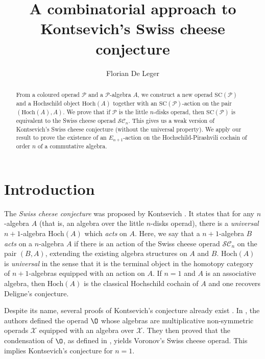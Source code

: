 \documentclass[]{amsart}
\title{A combinatorial approach to Kontsevich's Swiss cheese conjecture}
\author[Florian De Leger]{Florian De Leger}
\theoremstyle{definition}
\begin{document}
	
\begin{abstract}
	From a coloured operad $\mathcal{P}$ and a $\mathcal{P}$-algebra $A$, we construct a new operad $\mathrm{SC}(\mathcal{P})$ and a Hochschild object $\mathrm{Hoch}(A)$ together with an $\mathrm{SC}(\mathcal{P})$-action on the pair $(\mathrm{Hoch}(A),A)$. We prove that if $\mathcal{P}$ is the little $n$-disks operad, then $\mathrm{SC}(\mathcal{P})$ is equivalent to the Swiss cheese operad $\mathcal{SC}_n$.  This gives us a weak version of Kontsevich's Swiss cheese conjecture (without the universal property). We apply our result to prove the existence of an $E_{n+1}$-action on the Hochschild-Pirashvili cochain of order $n$ of a commutative algebra.
\end{abstract}
	
\maketitle

\tableofcontents

\section*{Introduction}

The \emph{Swiss cheese conjecture} was proposed by Kontsevich \cite[Claim 1]{kontsevich}. It states that for any $n$-algebra $A$ (that is, an algebra over the little $n$-disks operad), there is a \emph{universal} $n+1$-algebra $\mathrm{Hoch}(A)$ which \emph{acts} on $A$. Here, we say that a $n+1$-algebra $B$ \emph{acts} on a $n$-algebra $A$ if there is an action of the Swiss cheese operad $\mathcal{SC}_n$ \cite{voronov} on the pair $(B,A)$, extending the existing algebra structures on $A$ and $B$. $\mathrm{Hoch}(A)$ is \emph{universal} in the sense that it is the terminal object in the homotopy category of $n+1$-algebras equipped with an action on $A$. If $n=1$ and $A$ is an associative algebra, then $\mathrm{Hoch}(A)$ is the classical Hochschild cochain of $A$ and one recovers Deligne's conjecture.

Despite its name, several proofs of Kontsevich's conjecture already exist \cite{bataninshoikhet,dolgushev,hkv,thomas}. In \cite{dolgushev}, the authors defined the operad $\O$ whose algebras are multiplicative non-symmetric operads $\mathcal{X}$ equipped with an algebra over $\mathcal{X}$. They then proved \cite[Theorem 2.1]{dolgushev} that the condensation of $\O$, as defined in \cite[Section 1]{BataninBergerLattice}, yields Voronov's Swiss cheese operad. This implies Kontsevich's conjecture for $n=1$.
\end{document}
